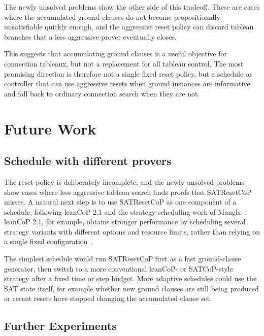 \documentclass{EasyChair3.5/easychair}
\newcommand{\cop}[1]{\textsf{#1}}
\newcommand{\satcopc}{\cop{SATCoP\textsuperscript{Con}}}
\begin{document}
The newly unsolved problems show the other side of this tradeoff.
These are cases where the accumulated ground clauses do not become propositionally unsatisfiable quickly enough, and the aggressive reset policy can discard tableau branches that a less aggressive prover eventually closes.

This suggests that accumulating ground clauses is a useful objective for connection tableaux, but not a replacement for all tableau control.
The most promising direction is therefore not a single fixed reset policy, but a schedule or controller that can use aggressive resets when ground instances are informative and fall back to ordinary connection search when they are not.

\section{Future Work}

\subsection{Schedule with different provers}
\label{schedule}

The reset policy is deliberately incomplete, and the newly unsolved problems show cases where less aggressive tableau search finds proofs that \cop{SATResetCoP} misses.
A natural next step is to use \cop{SATResetCoP} as one component of a schedule, following \cop{leanCoP 2.1} and the strategy-scheduling work of Mangla~\cite{leancopcut,mangla2022a}.
\cop{leanCoP 2.1}, for example, obtains stronger performance by scheduling several strategy variants with different options and resource limits, rather than relying on a single fixed configuration~\cite{leancopoverview}.

The simplest schedule would run \cop{SATResetCoP} first as a fast ground-clause generator, then switch to a more conventional \cop{leanCoP}- or \cop{SATCoP}-style strategy after a fixed time or step budget.
More adaptive schedules could use the SAT state itself, for example whether new ground clauses are still being produced or recent resets have stopped changing the accumulated clause set.

\subsection{Further Experiments}
\end{document}
